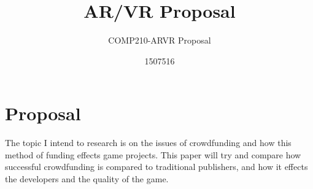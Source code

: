 \documentclass{scrartcl}
\title{AR/VR Proposal }
\subtitle{COMP210-ARVR Proposal}
\author{1507516}
\begin{document}
\maketitle

\section{Proposal}

The topic I intend to research is on the issues of crowdfunding and how this method of funding effects game projects. This paper will try and  compare how successful crowdfunding is compared to traditional publishers, and how it effects the developers and the quality of the game. 
\end{document}
